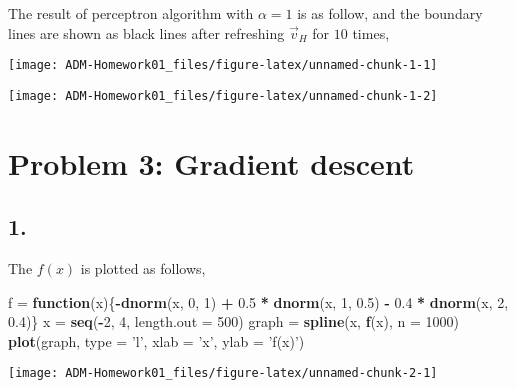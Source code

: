 \documentclass[]{article}
\newenvironment{Shaded}{\begin{snugshade}}{\end{snugshade}}
\newcommand{\KeywordTok}[1]{\textcolor[rgb]{0.13,0.29,0.53}{\textbf{#1}}}
\newcommand{\DataTypeTok}[1]{\textcolor[rgb]{0.13,0.29,0.53}{#1}}
\newcommand{\DecValTok}[1]{\textcolor[rgb]{0.00,0.00,0.81}{#1}}
\newcommand{\FloatTok}[1]{\textcolor[rgb]{0.00,0.00,0.81}{#1}}
\newcommand{\StringTok}[1]{\textcolor[rgb]{0.31,0.60,0.02}{#1}}
\newcommand{\ControlFlowTok}[1]{\textcolor[rgb]{0.13,0.29,0.53}{\textbf{#1}}}
\newcommand{\OperatorTok}[1]{\textcolor[rgb]{0.81,0.36,0.00}{\textbf{#1}}}
\newcommand{\NormalTok}[1]{#1}
\begin{document}
The result of perceptron algorithm with \(\alpha = 1\) is as follow, and
the boundary lines are shown as black lines after refreshing
\(\vec{v}_H\) for \(10\) times,

\begin{center}\texttt{[image: ADM-Homework01\_files/figure-latex/unnamed-chunk-1-1]} \end{center}

\begin{center}\texttt{[image: ADM-Homework01\_files/figure-latex/unnamed-chunk-1-2]} \end{center}

\section{Problem 3: Gradient descent}\label{problem-3-gradient-descent}

\subsection{1.}\label{section-6}

The \(f(x)\) is plotted as follows,

\begin{Shaded}
\begin{Highlighting}[]
\NormalTok{f =}\StringTok{ }\ControlFlowTok{function}\NormalTok{(x)\{}\OperatorTok{-}\KeywordTok{dnorm}\NormalTok{(x, }\DecValTok{0}\NormalTok{, }\DecValTok{1}\NormalTok{) }\OperatorTok{+}\StringTok{ }\FloatTok{0.5} \OperatorTok{*}\StringTok{ }\KeywordTok{dnorm}\NormalTok{(x, }\DecValTok{1}\NormalTok{, }\FloatTok{0.5}\NormalTok{) }\OperatorTok{-}\StringTok{ }\FloatTok{0.4} \OperatorTok{*}\StringTok{ }\KeywordTok{dnorm}\NormalTok{(x, }\DecValTok{2}\NormalTok{, }\FloatTok{0.4}\NormalTok{)\}}
\NormalTok{x =}\StringTok{ }\KeywordTok{seq}\NormalTok{(}\OperatorTok{-}\DecValTok{2}\NormalTok{, }\DecValTok{4}\NormalTok{, }\DataTypeTok{length.out =} \DecValTok{500}\NormalTok{)}
\NormalTok{graph =}\StringTok{ }\KeywordTok{spline}\NormalTok{(x, }\KeywordTok{f}\NormalTok{(x), }\DataTypeTok{n =} \DecValTok{1000}\NormalTok{)}
\KeywordTok{plot}\NormalTok{(graph, }\DataTypeTok{type =} \StringTok{'l'}\NormalTok{, }\DataTypeTok{xlab =} \StringTok{'x'}\NormalTok{, }\DataTypeTok{ylab =} \StringTok{'f(x)'}\NormalTok{)}
\end{Highlighting}
\end{Shaded}

\begin{center}\texttt{[image: ADM-Homework01\_files/figure-latex/unnamed-chunk-2-1]} \end{center}
\end{document}
